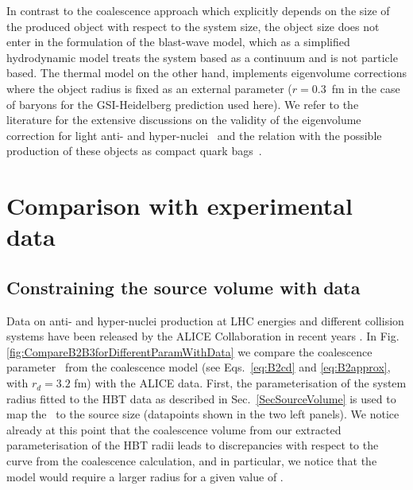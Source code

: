 \documentclass[a4paper,11pt]{scrartcl} %
\begin{document}
In contrast to the coalescence approach which explicitly depends on the size of the produced object with respect to the system size, the object size does not enter in the formulation of the blast-wave model, which as a simplified hydrodynamic model treats the system based as a continuum and is not particle based. The thermal model on the other hand, implements eigenvolume corrections where the object radius is fixed as an external parameter ($r=0.3$~fm in the case of baryons for the GSI-Heidelberg prediction used here). We refer to the literature for the extensive discussions on the validity of the eigenvolume correction for light anti- and hyper-nuclei~\cite{Vovchenko:2016mwg} and the relation with the possible production of these objects as compact quark bags~\cite{Andronic:2017}.



\section{Comparison with experimental data}\label{sec:comparison}

\subsection{Constraining the source volume with data}

Data on anti- and hyper-nuclei production at LHC energies and different collision systems have been released by the ALICE Collaboration in recent years \cite{ALICE:deuteronppPbPb2015,ALICE:nucleipp2017,ALICE:deuteronflow2017,Adam:2015yta}. 
In Fig. \ref{fig:CompareB2B3forDifferentParamWithData} we compare the coalescence parameter \btwo~from the coalescence model (see Eqs.~\ref{eq:B2cd} and \ref{eq:B2approx}, with $r_{d} = 3.2$ fm) with the ALICE data.  
First, the parameterisation of the system radius fitted to the HBT data as described in Sec.~\ref{SecSourceVolume} is used to map the \avdNdeta~to the source size (datapoints shown in the two left panels).
We notice already at this point that the coalescence volume from our extracted parameterisation of the HBT radii leads to discrepancies with respect to the curve from the coalescence calculation, and in particular, we notice that the model would require a larger radius for a given value of \btwo.
\end{document}
